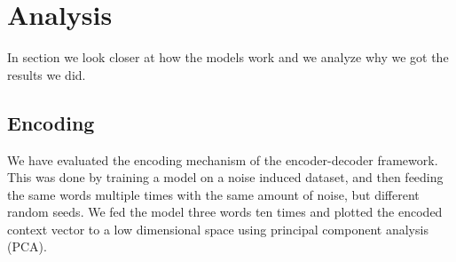 
\section{Analysis}
\label{sec:reasoning}
In section we look closer at how the models work and we analyze why we got the results we did. 

\subsection{Encoding}
We have evaluated the encoding mechanism of the encoder-decoder framework. This was done by training a model on a noise induced dataset, and then feeding the same words multiple times with the same amount of noise, but different random seeds. We fed the model three words ten times and plotted the encoded context vector to a low dimensional space using principal component analysis (PCA). 

